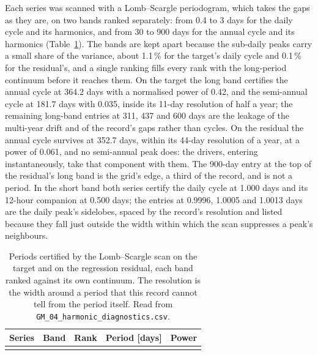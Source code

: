 \documentclass[11pt,a4paper]{article}
\begin{document}
Each series was scanned with a Lomb--Scargle periodogram, which takes the
gaps as they are, on two bands ranked separately: from 0.4 to 3 days for the
daily cycle and its harmonics, and from 30 to 900 days for the annual cycle
and its harmonics (Table~\ref{tab:certified-periods}). The bands are kept apart
because the sub-daily peaks carry a small share of the variance, about
1.1\,\% for the target's daily cycle and 0.1\,\% for the residual's, and a
single ranking fills every rank with the long-period continuum before it
reaches them. On the target the long band certifies the annual cycle at 364.2
days with a normalised power of 0.42, and the semi-annual cycle at 181.7 days
with 0.035, inside its 11-day resolution of half a year; the remaining
long-band entries at 311, 437 and 600 days are the leakage of the multi-year
drift and of the record's gaps rather than cycles. On the residual the annual
cycle survives at 352.7 days, within its 44-day resolution of a year, at a
power of 0.061, and no semi-annual peak does: the drivers, entering
instantaneously, take that component with them. The 900-day entry at the top
of the residual's long band is the grid's edge, a third of the record, and is
not a period. In the short band both series certify the daily cycle at 1.000
days and its 12-hour companion at 0.500 days; the entries at 0.9996, 1.0005
and 1.0013 days are the daily peak's sidelobes, spaced by the record's
resolution and listed because they fall just outside the width within which
the scan suppresses a peak's neighbours.

\begin{table}[H]
\centering
\caption{Periods certified by the Lomb--Scargle scan on the target and on the
regression residual, each band ranked against its own continuum. The
resolution is the width around a period that this record cannot tell from the
period itself. Read from \texttt{GM\_04\_harmonic\_diagnostics.csv}.}
\label{tab:certified-periods}
\begin{tabular}{llrrr}
\toprule
Series & Band & Rank & Period [days] & Power \\
\midrule
\\
\bottomrule
\end{tabular}
\end{table}
\end{document}
